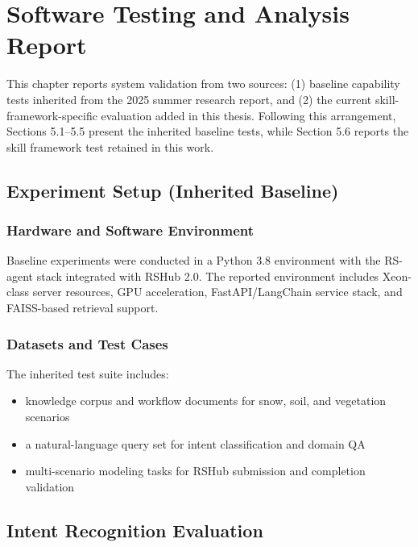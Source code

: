 \chapter{Software Testing and Analysis Report}
\label{ch:testing-report}

This chapter reports system validation from two sources: (1) baseline capability tests inherited from the 2025 summer research report, and (2) the current skill-framework-specific evaluation added in this thesis. Following this arrangement, Sections 5.1--5.5 present the inherited baseline tests, while Section 5.6 reports the skill framework test retained in this work.

\section{Experiment Setup (Inherited Baseline)}
\label{sec:test-env}

\subsection{Hardware and Software Environment}
Baseline experiments were conducted in a Python 3.8 environment with the RS-agent stack integrated with RSHub 2.0. The reported environment includes Xeon-class server resources, GPU acceleration, FastAPI/LangChain service stack, and FAISS-based retrieval support.

\subsection{Datasets and Test Cases}
The inherited test suite includes:
\begin{itemize}
	\item knowledge corpus and workflow documents for snow, soil, and vegetation scenarios
	\item a natural-language query set for intent classification and domain QA
	\item multi-scenario modeling tasks for RSHub submission and completion validation
\end{itemize}

\section{Intent Recognition Evaluation}
\label{sec:test-intent}

